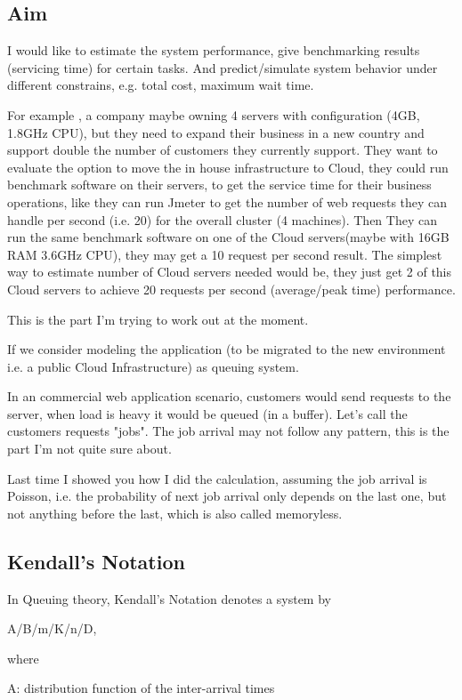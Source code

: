 \subsection{Aim}
I would like to estimate the system performance, give benchmarking results (servicing time) for certain tasks. And predict/simulate system behavior under different constrains, e.g. total cost, maximum wait time. 

For example , a company maybe owning 4 servers with configuration (4GB, 1.8GHz CPU), but they need to expand their business in a new country and support double the number of customers they currently support. They want to evaluate the option to move the in house infrastructure to Cloud, they could run benchmark software on their servers, to get the service time for their business operations, like they can run Jmeter to get the number of web requests they can handle per second (i.e. 20) for the overall cluster (4 machines). 
Then They can run the same benchmark software on one of the Cloud servers(maybe with 16GB RAM 3.6GHz CPU), they may get a 10 request per second result.
The simplest way to estimate number of Cloud servers needed would be, they just get 2 of this Cloud servers to achieve 20 requests per second (average/peak time) performance.

This is the part I'm trying to work out at the moment.

If we consider modeling the application (to be migrated to the new environment i.e. a public Cloud Infrastructure) as queuing system.

In an commercial web application scenario, customers would send requests to the server, when load is heavy it would be queued (in a buffer). Let's call the customers requests "jobs".
The job arrival may not follow any pattern, this is the part I'm not quite sure about.

Last time I showed you how I did the calculation, assuming the job arrival is Poisson, i.e. the probability of next job arrival only depends on the last one, but not anything before the last, which is also called memoryless.

\subsection{Kendall’s Notation}
In Queuing theory, Kendall’s Notation denotes a system by

A/B/m/K/n/D,

where

A: distribution function of the inter-arrival times


